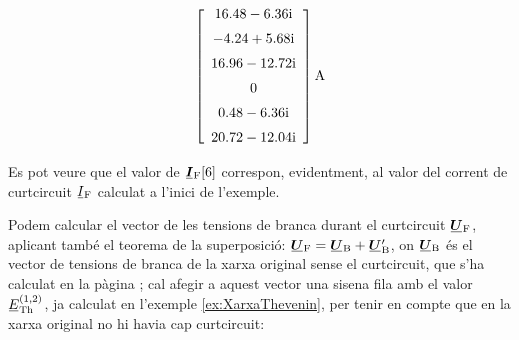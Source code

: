 \begin{exemple}
\[\begin{bmatrix}
\begin{array}{c}
		\complexnum{ 16,48 - j 6,36} \\[2mm]
		\complexnum{-4,24 + j 5,68}  \\[2mm]
		\complexnum{16,96 - j 12,72} \\[2mm]
			0  \\[2mm]
		\complexnum{0,48 - j 6,36} \\[2mm]
		\complexnum{20,72 - j 12,04}
	\end{array}\end{bmatrix}\unit{A}
	\]
	
	Es pot veure que el valor de $\mcmplx{I}\ped{F}[6]$ correspon, evidentment, al valor del corrent de curtcircuit $\cmplx{I}\ped{F}$ calculat a l'inici de l'exemple.
	
	Podem calcular el vector de les tensions de branca durant el curtcircuit $\mcmplx{U}\ped{F}$, aplicant també el teorema de la superposició: $\mcmplx{U}\ped{F} = \mcmplx{U}\ped{B} + \mcmplx{U}'\ped{B}$, on $\mcmplx{U}\ped{B}$ és el vector de tensions de branca de la xarxa original sense el curtcircuit, que s'ha calculat en la pàgina \pageref{eq:ub-exemp}; cal afegir a aquest vector una sisena fila amb el valor $\cmplx{E}\ped{Th}^{(1,2)}$, ja calculat en l'exemple \ref{ex:XarxaThevenin}, per tenir en compte que en la xarxa original no hi havia cap curtcircuit:
	

\end{exemple}

